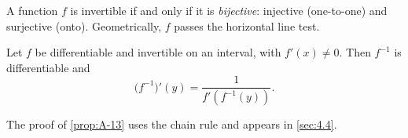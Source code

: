 \begin{remark}
A function $f$ is invertible if and only if it is \textit{bijective}:
injective (one-to-one) and surjective (onto).
Geometrically, $f$ passes the horizontal line test.
\end{remark}

\begin{proposition}\label{prop:A-13}
Let $f$ be differentiable and invertible on an interval,
with $f'(x) \neq 0$. Then $f^{-1}$ is differentiable and
\[
  \bigl(f^{-1}\bigr)'(y) = \dfrac{1}{f'\!\left(f^{-1}(y)\right)}.
\]
\end{proposition}

\begin{remark}
The proof of \cref{prop:A-13} uses the chain rule and appears in
\cref{sec:4.4}.
\end{remark}
